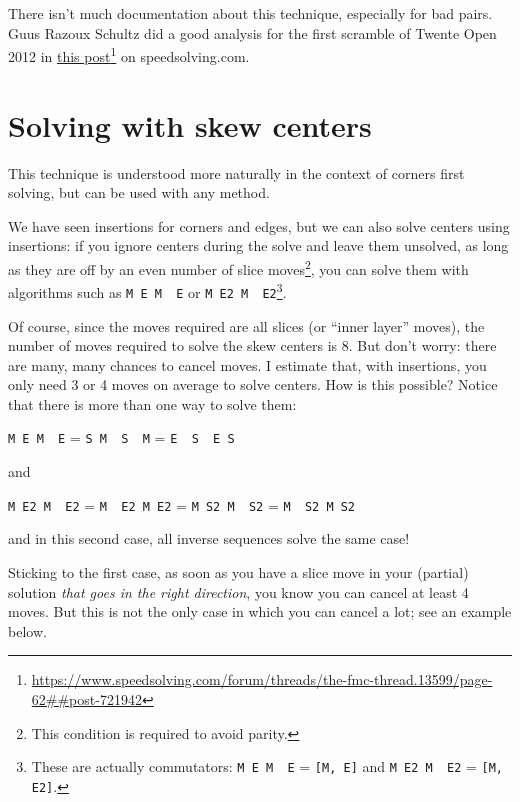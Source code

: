 \documentclass[11pt,a4paper]{book}
\newcommand{\p}{\textquotesingle}
\newcommand{\m}{\texttt}
\newcommand{\ps}{\p\,\,}
\begin{document}
There isn't much documentation about this technique, especially for bad pairs. Guus Razoux Schultz did a good analysis for the first scramble of Twente Open 2012 in \href{https://www.speedsolving.com/forum/threads/the-fmc-thread.13599/page-62\#post-721942}{this post}\footnote{\url{https://www.speedsolving.com/forum/threads/the-fmc-thread.13599/page-62##post-721942}} on speedsolving.com. 

\section{Solving with skew centers}
\label{skew_centers}

This technique is understood more naturally in the context of corners first solving, but can be used with any method.

We have seen insertions for corners and edges, but we can also solve centers using insertions: if you ignore centers during the solve and leave them unsolved, as long as they are off by an even number of slice moves\footnote{This condition is required to avoid parity.}, you can solve them with algorithms such as \m{M E M\ps E\p} or \m{M E2 M\ps E2}\footnote{These are actually commutators: \m{M E M\ps E\p} = \m{[M, E]} and \m{M E2 M\ps E2} = \m{[M, E2]}.}.

Of course, since the moves required are all slices (or ``inner layer'' moves), the number of moves required to solve the skew centers is 8. But don't worry: there are many, many chances to cancel moves. I estimate that, with insertions, you only need 3 or 4 moves on average to solve centers. How is this possible? Notice that there is more than one way to solve them:

\begin{center}
\m{M E M\ps E\p} = \m{S M\ps S\ps M} = \m{E\ps S\ps E S}
\end{center}

and 

\begin{center}
\m{M E2 M\ps E2} = \m{M\ps E2 M E2} = \m{M S2 M\ps S2} = \m{M\ps S2 M S2}
\end{center}

and in this second case, all inverse sequences solve the same case!

Sticking to the first case, as soon as you have a slice move in your (partial) solution \emph{that goes in the right direction}, you know you can cancel at least 4 moves. But this is not the only case in which you can cancel a lot; see an example below.%
\end{document}
